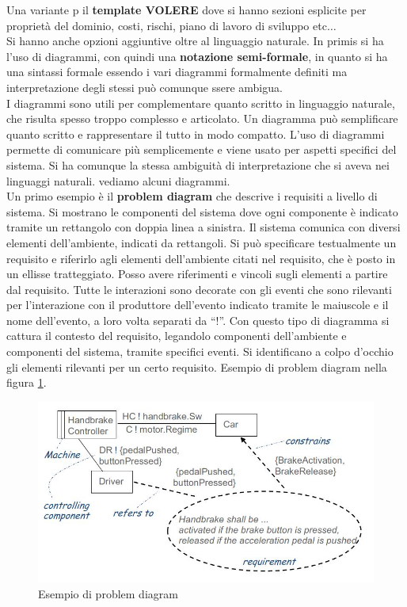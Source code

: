 \documentclass[a4paper,12pt, oneside]{book}
\begin{document}
Una variante p il \textbf{template VOLERE} dove si hanno sezioni esplicite per
proprietà del dominio, costi, rischi, piano di lavoro di sviluppo etc$\ldots$\\
Si hanno anche opzioni aggiuntive oltre al linguaggio naturale. In primis si ha
l'uso di diagrammi, con quindi una \textbf{notazione semi-formale}, in quanto si
ha una sintassi formale essendo i vari diagrammi formalmente definiti ma
interpretazione degli stessi può comunque ssere ambigua.\\
I diagrammi sono utili per complementare quanto scritto in linguaggio naturale,
che risulta spesso troppo complesso e articolato. Un diagramma può semplificare
quanto scritto e rappresentare il tutto in modo compatto. L'uso di diagrammi
permette di comunicare più semplicemente e viene usato per aspetti specifici del
sistema. Si ha comunque la stessa ambiguità di interpretazione che si aveva nei
linguaggi naturali. vediamo alcuni diagrammi.\\
Un primo esempio è il \textbf{problem diagram} che descrive i requisiti a livello
di sistema. Si mostrano le componenti del sistema dove ogni componente è
indicato tramite un rettangolo con doppia linea a sinistra. Il sistema comunica
con diversi elementi dell'ambiente, indicati da rettangoli. Si può specificare
testualmente un requisito e riferirlo agli elementi dell'ambiente citati nel
requisito, che è posto in un ellisse tratteggiato. Posso avere riferimenti e
vincoli sugli elementi a partire dal requisito. Tutte le interazioni sono
decorate con gli eventi che sono rilevanti per l'interazione con il produttore
dell'evento indicato tramite le maiuscole e il nome dell'evento, a loro volta
separati da ``!''. Con questo tipo di diagramma si cattura il contesto del
requisito, legandolo  componenti dell'ambiente e componenti del sistema, tramite
specifici eventi. Si identificano a colpo d'occhio gli elementi rilevanti per un
certo requisito.
Esempio di problem diagram nella figura \ref{fig:pd}.
\begin{figure}
  \centering
  \includegraphics[scale = 0.4]{img/pd.jpg}
  \caption{Esempio di problem diagram}
  \label{fig:pd}
\end{figure}
\end{document}
